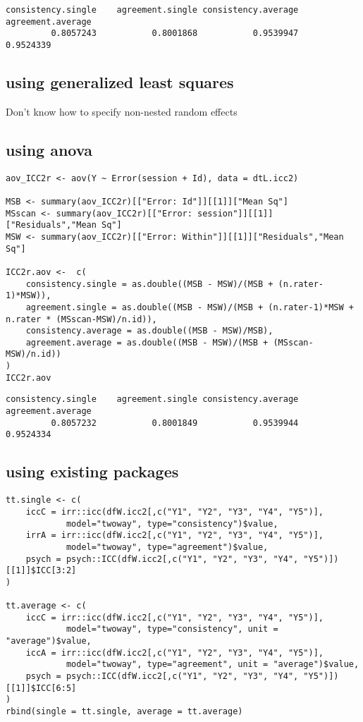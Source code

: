 \documentclass[12pt]{article}
\begin{document}
\begin{verbatim}
consistency.single    agreement.single consistency.average   agreement.average 
         0.8057243           0.8001868           0.9539947           0.9524339
\end{verbatim}

\clearpage

\subsection{using generalized least squares}
\label{sec:org18a1437}
Don't know how to specify non-nested random effects

\subsection{using anova}
\label{sec:orgf330dea}
\lstset{language=r,label= ,caption= ,captionpos=b,numbers=none}
\begin{lstlisting}
aov_ICC2r <- aov(Y ~ Error(session + Id), data = dtL.icc2) 

MSB <- summary(aov_ICC2r)[["Error: Id"]][[1]]["Mean Sq"]
MSscan <- summary(aov_ICC2r)[["Error: session"]][[1]]["Residuals","Mean Sq"]
MSW <- summary(aov_ICC2r)[["Error: Within"]][[1]]["Residuals","Mean Sq"]

ICC2r.aov <-  c(
    consistency.single = as.double((MSB - MSW)/(MSB + (n.rater-1)*MSW)),
    agreement.single = as.double((MSB - MSW)/(MSB + (n.rater-1)*MSW + n.rater * (MSscan-MSW)/n.id)),
    consistency.average = as.double((MSB - MSW)/MSB),
    agreement.average = as.double((MSB - MSW)/(MSB + (MSscan-MSW)/n.id))
)
ICC2r.aov
\end{lstlisting}

\begin{verbatim}
consistency.single    agreement.single consistency.average   agreement.average 
         0.8057232           0.8001849           0.9539944           0.9524334
\end{verbatim}

\subsection{using existing packages}
\label{sec:orgae24fdf}
\lstset{language=r,label= ,caption= ,captionpos=b,numbers=none}
\begin{lstlisting}
tt.single <- c(
    iccC = irr::icc(dfW.icc2[,c("Y1", "Y2", "Y3", "Y4", "Y5")],
		    model="twoway", type="consistency")$value,
    irrA = irr::icc(dfW.icc2[,c("Y1", "Y2", "Y3", "Y4", "Y5")],
		    model="twoway", type="agreement")$value,
    psych = psych::ICC(dfW.icc2[,c("Y1", "Y2", "Y3", "Y4", "Y5")])[[1]]$ICC[3:2]
)

tt.average <- c(
    iccC = irr::icc(dfW.icc2[,c("Y1", "Y2", "Y3", "Y4", "Y5")],
		    model="twoway", type="consistency", unit = "average")$value,
    iccA = irr::icc(dfW.icc2[,c("Y1", "Y2", "Y3", "Y4", "Y5")],
		    model="twoway", type="agreement", unit = "average")$value,
    psych = psych::ICC(dfW.icc2[,c("Y1", "Y2", "Y3", "Y4", "Y5")])[[1]]$ICC[6:5]
)
rbind(single = tt.single, average = tt.average)
\end{lstlisting}
\end{document}

